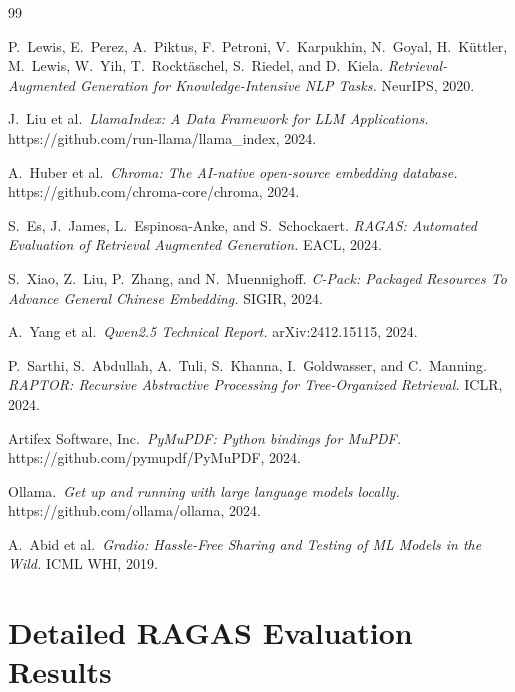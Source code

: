 \documentclass[11pt, a4paper]{article}
\begin{document}
\begin{thebibliography}{99}

    P.~Lewis, E.~Perez, A.~Piktus, F.~Petroni, V.~Karpukhin, N.~Goyal, H.~K\"{u}ttler, M.~Lewis, W.~Yih, T.~Rockt\"{a}schel, S.~Riedel, and D.~Kiela.
    \emph{Retrieval-Augmented Generation for Knowledge-Intensive NLP Tasks.}
    NeurIPS, 2020.

    J.~Liu et al.\ \emph{LlamaIndex: A Data Framework for LLM Applications.}
    https://github.com/run-llama/llama\_index, 2024.

    A.~Huber et al.\ \emph{Chroma: The AI-native open-source embedding database.}
    https://github.com/chroma-core/chroma, 2024.

    S.~Es, J.~James, L.~Espinosa-Anke, and S.~Schockaert.
    \emph{RAGAS: Automated Evaluation of Retrieval Augmented Generation.}
    EACL, 2024.

    S.~Xiao, Z.~Liu, P.~Zhang, and N.~Muennighoff.
    \emph{C-Pack: Packaged Resources To Advance General Chinese Embedding.}
    SIGIR, 2024.

    A.~Yang et al.\ \emph{Qwen2.5 Technical Report.}
    arXiv:2412.15115, 2024.

    P.~Sarthi, S.~Abdullah, A.~Tuli, S.~Khanna, I.~Goldwasser, and C.~Manning.
    \emph{RAPTOR: Recursive Abstractive Processing for Tree-Organized Retrieval.}
    ICLR, 2024.

    Artifex Software, Inc.\ \emph{PyMuPDF: Python bindings for MuPDF.}
    https://github.com/pymupdf/PyMuPDF, 2024.

    Ollama.\ \emph{Get up and running with large language models locally.}
    https://github.com/ollama/ollama, 2024.

    A.~Abid et al.\ \emph{Gradio: Hassle-Free Sharing and Testing of ML Models in the Wild.}
    ICML WHI, 2019.

\end{thebibliography}


\newpage
\appendix
\section{Detailed RAGAS Evaluation Results}
\end{document}
